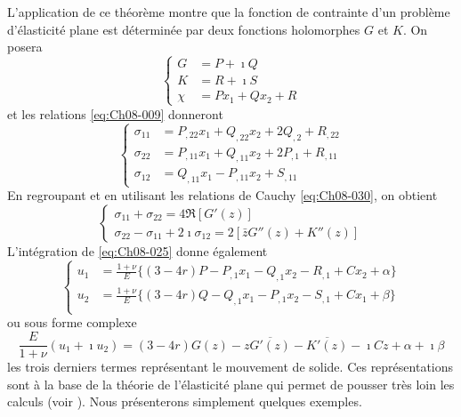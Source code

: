 L'application de ce théorème montre que la fonction de contrainte d'un problème d'élasticité plane est déterminée par deux fonctions holomorphes $G$ et $K$.
On posera 
\begin{equation}
  \begin{cases}
    G    & = P + \imath Q \\
    K    & = R + \imath S \\
    \chi & = Px_1 + Qx_2 + R
  \end{cases}
\label{eq:Ch08-031}
\end{equation}
et les relations \eqref{eq:Ch08-009} donneront 
\begin{equation}
  \begin{cases}
    \sigma_{11} & = P_{,22} x_1 + Q_{,22} x_2 + 2 Q_{,2} + R_{,22} \\
    \sigma_{22} & = P_{,11} x_1 + Q_{,11} x_2 + 2 P_{,1} + R_{,11} \\
    \sigma_{12} & = Q_{,11} x_1 - P_{,11} x_2 + S_{,11}
  \end{cases}
\label{eq:Ch08-032}
\end{equation}
En regroupant et en utilisant les relations de Cauchy \eqref{eq:Ch08-030}, on obtient 
\begin{equation}
    \begin{cases}
        \sigma_{11} + \sigma_{22} = 4 \Re \left[ G'(z) \right] \\
        \sigma_{22} - \sigma_{11} + 2 \imath \sigma_{12} = 2 \left[ \bar{z}G''(z) + K''(z) \right]
    \end{cases}
    \label{eq:Ch08-033}
\end{equation}
L'intégration de \eqref{eq:Ch08-025} donne également 
\begin{equation}
  \left\{
  \begin{aligned}
    u_1 & = \frac{1+\nu}{E}\{(3-4r)P - P_{,1}x_1 - Q_{,1}x_2 - R_{,1} + Cx_2 + \alpha \}\\
    u_2 & = \frac{1+\nu}{E}\{(3-4r)Q - Q_{,1}x_1 - P_{,1}x_2 - S_{,1} + Cx_1 + \beta \}\\
  \end{aligned}
  \right.
\label{eq:Ch08-034}
\end{equation}
ou sous forme complexe 
\begin{equation}
    \frac{E}{1+\nu}(u_1 + \imath u_2) = (3-4r)G(z) - z\overline{G'(z)} - \overline{K'(z)} - \imath C z + \alpha +\imath\beta
    \label{eq:Ch08-035}
\end{equation}
les trois derniers termes représentant le mouvement de solide. 
Ces représentations sont à la base de la théorie de l'élasticité plane qui permet de pousser très loin les calculs (voir \cite{Muskhelishvili-53}). 
Nous présenterons simplement quelques exemples.

